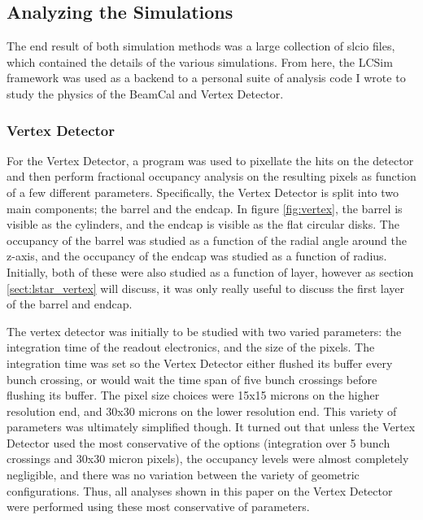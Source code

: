 \documentclass{report}
\begin{document}
            \subsection{Analyzing the Simulations}
                The end result of both simulation methods was a large collection of slcio files, which contained the details of the various simulations. From here, the LCSim framework was used as a backend to a personal suite of analysis code I wrote to study the physics of the BeamCal and Vertex Detector.
                
                \subsubsection{Vertex Detector} \label{sect:methods_vertex}
                    For the Vertex Detector, a program was used to pixellate the hits on the detector and then perform fractional occupancy analysis on the resulting pixels as function of a few different parameters. Specifically, the Vertex Detector is split into two main components; the barrel and the endcap. In figure \ref{fig:vertex}, the barrel is visible as the cylinders, and the endcap is visible as the flat circular disks. The occupancy of the barrel was studied as a function of the radial angle around the z-axis, and the occupancy of the endcap was studied as a function of radius. Initially, both of these were also studied as a function of layer, however as section \ref{sect:lstar_vertex} will discuss, it was only really useful to discuss the first layer of the barrel and endcap.

                    The vertex detector was initially to be studied with two varied parameters: the integration time of the readout electronics, and the size of the pixels. The integration time was set so the Vertex Detector either flushed its buffer every bunch crossing, or would wait the time span of five bunch crossings before flushing its buffer. The pixel size choices were 15x15 microns on the higher resolution end, and 30x30 microns on the lower resolution end. This variety of parameters was ultimately simplified though. It turned out that unless the Vertex Detector used the most conservative of the options (integration over 5 bunch crossings and 30x30 micron pixels), the occupancy levels were almost completely negligible, and there was no variation between the variety of geometric configurations. Thus, all analyses shown in this paper on the Vertex Detector were performed using these most conservative of parameters.
\end{document}
